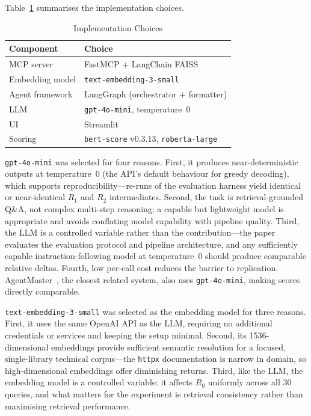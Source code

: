 \documentclass[10pt,journal,compsoc]{IEEEtran}
\begin{document}
Table~\ref{tab:impl} summarises the implementation choices.

\begin{table}[h]
  \caption{Implementation Choices}
  \label{tab:impl}
  \centering
  \begin{tabular}{ll}
    \toprule
    \textbf{Component}  & \textbf{Choice} \\
    \midrule
    MCP server          & FastMCP + LangChain FAISS \\
    Embedding model     & \texttt{text-embedding-3-small} \\
    Agent framework     & LangGraph (orchestrator + formatter) \\
    LLM                 & \texttt{gpt-4o-mini}, temperature~0 \\
    UI                  & Streamlit \\
    Scoring             & \texttt{bert-score} v0.3.13, \texttt{roberta-large} \\
    \bottomrule
  \end{tabular}
\end{table}

\texttt{gpt-4o-mini} was selected for four reasons. First, it produces
near-deterministic outputs at temperature~0 (the API's default behaviour for
greedy decoding), which supports reproducibility---re-runs of the evaluation
harness yield identical or near-identical $R_1$ and $R_2$ intermediates. Second, the task is retrieval-grounded Q\&A, not complex
multi-step reasoning; a capable but lightweight model is appropriate and avoids
conflating model capability with pipeline quality. Third, the LLM is a controlled
variable rather than the contribution---the paper evaluates the evaluation protocol
and pipeline architecture, and any sufficiently capable instruction-following model
at temperature~0 should produce comparable relative deltas. Fourth, low per-call
cost reduces the barrier to replication. AgentMaster~\cite{liao2025agentmaster},
the closest related system, also uses \texttt{gpt-4o-mini}, making scores directly
comparable.

\texttt{text-embedding-3-small} was selected as the embedding model for three
reasons. First, it uses the same OpenAI API as the LLM, requiring no additional
credentials or services and keeping the setup minimal. Second, its 1536-dimensional
embeddings provide sufficient semantic resolution for a focused, single-library
technical corpus---the \texttt{httpx} documentation is narrow in domain, so
high-dimensional embeddings offer diminishing returns. Third, like the LLM, the
embedding model is a controlled variable: it affects $R_0$ uniformly across all 30
queries, and what matters for the experiment is retrieval consistency rather than
maximising retrieval performance.
\end{document}
